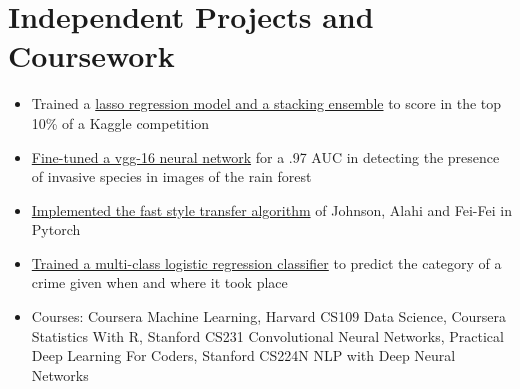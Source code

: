 \documentclass[11pt]{article}
\begin{document}
	\section{Independent Projects and Coursework}
		\begin{itemize}
			\item Trained a \href{https://github.com/ryankresse/ames_housing}{lasso regression model and a stacking ensemble} to score in the top 10\% of a Kaggle competition
			\item \href{https://github.com/ryankresse/invasive_species}{Fine-tuned a vgg-16 neural network} for a .97 AUC in detecting the presence of invasive species in images of the rain forest 
			\item \href{https://github.com/ryankresse/fast_style_transfer_pytorch}{Implemented the fast style transfer algorithm} of Johnson, Alahi and Fei-Fei in Pytorch
			\item \href{https://github.com/ryankresse/sf-crime}{Trained a multi-class logistic regression classifier} to predict the category of a crime given when and where it took place
			\item Courses: Coursera Machine Learning, Harvard CS109 Data Science, Coursera Statistics With R, Stanford CS231 Convolutional Neural Networks, Practical Deep Learning For Coders, Stanford CS224N NLP with Deep Neural Networks
			\begin{comment}
			\begin{itemize}[noitemsep]
				\item Coursera: Machine Learning 
				\item Harvard CS109: Data Science
				\item Coursera: Statistics With R 
				\item Stanford CS231: Convolutional Neural Networks
				\item Practical Deep Learning For Coders 
				\item Stanford CS224N: NLP with Deep Neural Networks
			\end{itemize}
			\end{comment}
		\end{itemize}
\end{document}

